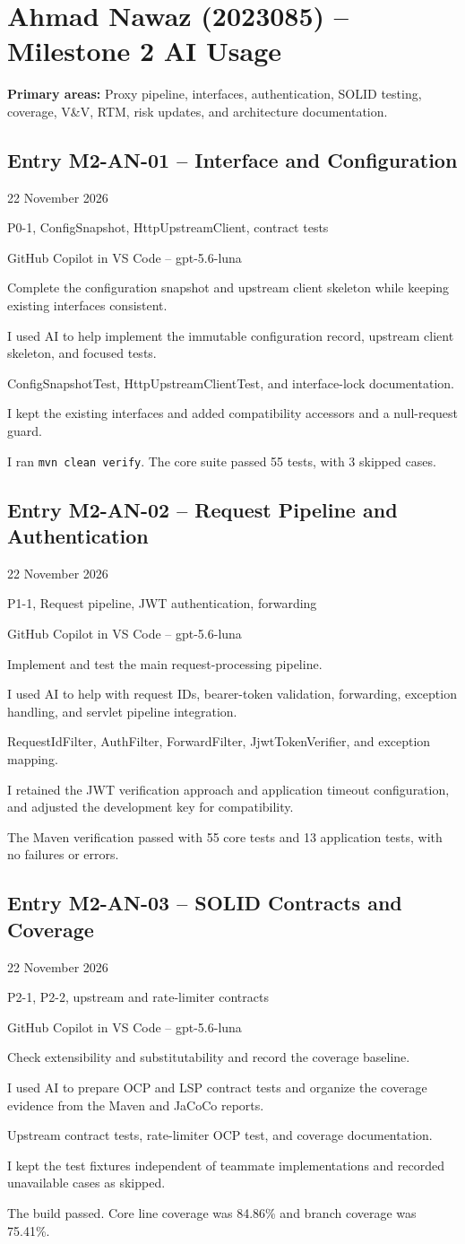 \documentclass[11pt,a4paper]{article}
\newcommand{\ailogentry}[9]{
\subsection*{#1}
\begin{description}[leftmargin=3.2cm,style=nextline,font=\bfseries]
\item[Date] #2
\item[Module] #3
\item[AI Tool] #4
\item[Purpose] #5
\item[Activity] #6
\item[Used] #7
\item[Changes] #8
\item[Verification] #9
\end{description}
}
\begin{document}

\section{Ahmad Nawaz (2023085) -- Milestone 2 AI Usage}

\textbf{Primary areas:} Proxy pipeline, interfaces, authentication,
SOLID testing, coverage, V\&V, RTM, risk updates, and architecture documentation.

\ailogentry
{Entry M2-AN-01 -- Interface and Configuration}
{22 November 2026}
{P0-1, ConfigSnapshot, HttpUpstreamClient, contract tests}
{GitHub Copilot in VS Code -- gpt-5.6-luna}
{Complete the configuration snapshot and upstream client skeleton while keeping existing interfaces consistent.}
{I used AI to help implement the immutable configuration record, upstream client skeleton, and focused tests.}
{ConfigSnapshotTest, HttpUpstreamClientTest, and interface-lock documentation.}
{I kept the existing interfaces and added compatibility accessors and a null-request guard.}
{I ran \texttt{mvn clean verify}. The core suite passed 55 tests, with 3 skipped cases.}

\ailogentry
{Entry M2-AN-02 -- Request Pipeline and Authentication}
{22 November 2026}
{P1-1, Request pipeline, JWT authentication, forwarding}
{GitHub Copilot in VS Code -- gpt-5.6-luna}
{Implement and test the main request-processing pipeline.}
{I used AI to help with request IDs, bearer-token validation, forwarding, exception handling, and servlet pipeline integration.}
{RequestIdFilter, AuthFilter, ForwardFilter, JjwtTokenVerifier, and exception mapping.}
{I retained the JWT verification approach and application timeout configuration, and adjusted the development key for compatibility.}
{The Maven verification passed with 55 core tests and 13 application tests, with no failures or errors.}

\ailogentry
{Entry M2-AN-03 -- SOLID Contracts and Coverage}
{22 November 2026}
{P2-1, P2-2, upstream and rate-limiter contracts}
{GitHub Copilot in VS Code -- gpt-5.6-luna}
{Check extensibility and substitutability and record the coverage baseline.}
{I used AI to prepare OCP and LSP contract tests and organize the coverage evidence from the Maven and JaCoCo reports.}
{Upstream contract tests, rate-limiter OCP test, and coverage documentation.}
{I kept the test fixtures independent of teammate implementations and recorded unavailable cases as skipped.}
{The build passed. Core line coverage was 84.86\% and branch coverage was 75.41\%.}
\end{document}
